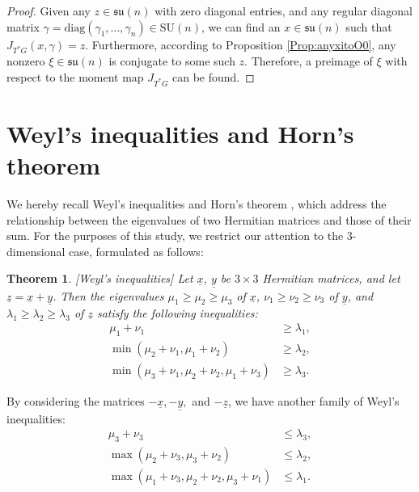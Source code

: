 \documentclass[12pt]{amsart}
\newtheorem{theorem}{Theorem}[section]
\theoremstyle{definition}
\numberwithin{equation}{section}
\def\diag{\mathrm{diag}}
\newcommand{\SU}{\mathrm{SU}}
\newcommand{\su}{\mathfrak{su}}
\begin{document}
{\begin{proof}  Given any $z \in \su(n)$ with zero diagonal entries, and any regular diagonal matrix $\gamma = \diag(\gamma_1, \dots, \gamma_n) \in \SU(n)$, we can find an $x \in \su(n)$ such that $J_{T^*G}(x, \gamma) = z$. Furthermore, according to Proposition \ref{Prop:anyxitoO0}, any nonzero $\xi \in \su(n)$ is conjugate to some such $z$. Therefore, a preimage of $\xi$ with respect to the moment map $J_{T^*G}$ can be found.
\end{proof}


\section{Weyl's inequalities and Horn's theorem}\label{appendixSec:Horn}

We hereby recall Weyl's inequalities and Horn’s theorem \cite{Horn}, which address the relationship between the eigenvalues of two Hermitian matrices    and those of their sum.  For the purposes of this study, we restrict our attention to the  $3$-dimensional case, formulated as follows:
 
 
\begin{theorem}
  \label{Thm:3X3Weyl}[Weyl's inequalities] \cite{Weylinequality1,Weylinequality2} Let 
  $\underline{x}$, $\underline{y}$ be  $3\times 3$ Hermitian matrices, and  let $\underline{z}=\underline{x}+\underline{y}$. Then   the 
   eigenvalues    $\mu_1\geqslant \mu_2\geqslant \mu_3$ of $\underline{x}$,   $\nu_1\geqslant \nu_2\geqslant \nu_3$ of $\underline{y}$, and $\lambda_1\geqslant \lambda_2\geqslant \lambda_3$ of $\underline{z}$ satisfy the following inequalities:
   \begin{align}\label{Eqt:Weyl1}
\mu_1 + \nu_1 &\geqslant\lambda_1, \\\label{Eqt:Weyl2}
\min(\mu_2 + \nu_1,\mu_1 + \nu_2) &\geqslant\lambda_2, \\\label{Eqt:Weyl6} 
\min(\mu_3 + \nu_1,\mu_2 + \nu_2,\mu_1 + \nu_3) &\geqslant\lambda_3.
\end{align}
\end{theorem} 
By considering the  matrices $-\underline{x}, -\underline{y},$ and $-\underline{z}$, we have another family of Weyl's inequalities:
 \begin{align}\label{Eqt:Weyl1moremore}
\mu_3 + \nu_3 &\leqslant\lambda_3, \\\label{Eqt:Weyl2moremore}
\max(\mu_2 + \nu_3,\mu_3 + \nu_2) &\leqslant\lambda_2, \\\label{Eqt:Weyl6moremore} 
\max(\mu_1 + \nu_3,\mu_2 + \nu_2,\mu_3 + \nu_1) &\leqslant\lambda_1.
\end{align}
 
}
\end{document}
